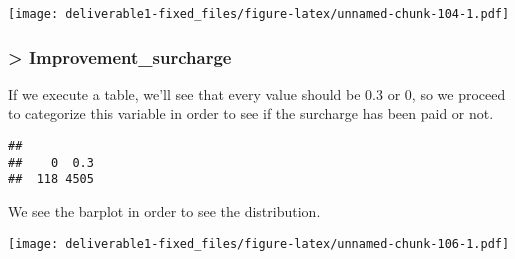 \documentclass[
  18pt,
  a4paper]{article}
\newenvironment{Shaded}{\begin{snugshade}}{\end{snugshade}}
\newcommand{\DataTypeTok}[1]{\textcolor[rgb]{0.13,0.29,0.53}{#1}}
\newcommand{\KeywordTok}[1]{\textcolor[rgb]{0.13,0.29,0.53}{\textbf{#1}}}
\newcommand{\NormalTok}[1]{#1}
\newcommand{\OperatorTok}[1]{\textcolor[rgb]{0.81,0.36,0.00}{\textbf{#1}}}
\newcommand{\StringTok}[1]{\textcolor[rgb]{0.31,0.60,0.02}{#1}}
\begin{document}
\texttt{[image: deliverable1-fixed\_files/figure-latex/unnamed-chunk-104-1.pdf]}

\hypertarget{improvement_surcharge-1}{%
\subsubsection{\textgreater{}
Improvement\_surcharge}\label{improvement_surcharge-1}}

If we execute a table, we'll see that every value should be 0.3 or 0, so
we proceed to categorize this variable in order to see if the surcharge
has been paid or not.

\begin{Shaded}
\end{Shaded}

\begin{verbatim}
## 
##    0  0.3 
##  118 4505
\end{verbatim}

\begin{Shaded}
\end{Shaded}

We see the barplot in order to see the distribution.

\begin{Shaded}
\end{Shaded}

\texttt{[image: deliverable1-fixed\_files/figure-latex/unnamed-chunk-106-1.pdf]}
\end{document}
